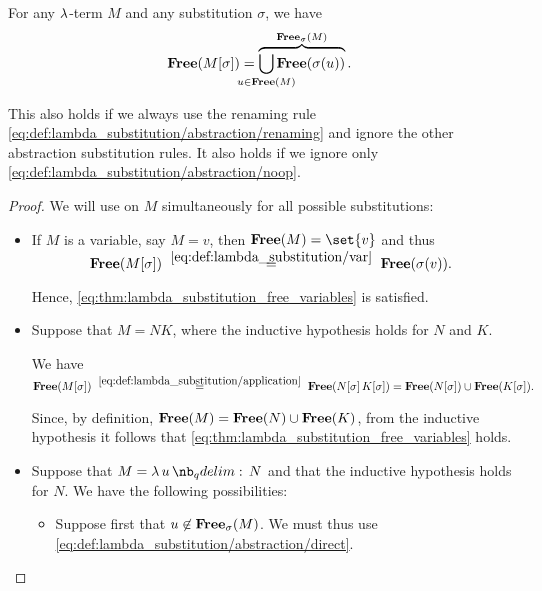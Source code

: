 \begin{proposition}\label{thm:lambda_substitution_free_variables}
  For any \( \mathrm{\lambda} \)-term \( M \) and any substitution \( \sigma \), we have
  \begin{equation}\label{eq:thm:lambda_substitution_free_variables}
    \op*{Free}( M[\sigma] ) = \overbrace{\bigcup_{\mathclap{u \in \op*{Free}(M)}} \op*{Free}(\sigma(u))}^{\op*{Free}_\sigma(M)}.
  \end{equation}

  This also holds if we always use the renaming rule \eqref{eq:def:lambda_substitution/abstraction/renaming} and ignore the other abstraction substitution rules. It also holds if we ignore only \eqref{eq:def:lambda_substitution/abstraction/noop}.
\end{proposition}
\begin{proof}
  We will use  on \( M \) simultaneously for all possible substitutions:
  \begin{itemize}
    \item If \( M \) is a variable, say \( M = v \), then \( \op*{Free}(M) = \set{ v } \) and thus
    \begin{equation*}
      \op*{Free}(M[\sigma])
      \reloset {\eqref{eq:def:lambda_substitution/var}} =
      \op*{Free}(\sigma(v)).
    \end{equation*}

    Hence, \eqref{eq:thm:lambda_substitution_free_variables} is satisfied.

    \item Suppose that \( M = NK \), where the inductive hypothesis holds for \( N \) and \( K \).

    We have
    \begin{equation*}
      \op*{Free}(M[\sigma])
      \reloset {\eqref{eq:def:lambda_substitution/application}} =
      \op*{Free}(N[\sigma] \thinspace K[\sigma])
      =
      \op*{Free}(N[\sigma]) \cup \op*{Free}(K[\sigma]).
    \end{equation*}

    Since, by definition, \( \op*{Free}(M) = \op*{Free}(N) \cup \op*{Free}(K) \), from the inductive hypothesis it follows that \eqref{eq:thm:lambda_substitution_free_variables} holds.

    \item Suppose that \( M = \qabs u N \) and that the inductive hypothesis holds for \( N \). We have the following possibilities:
    \begin{itemize}
      \item Suppose first that \( u \not\in \op*{Free}_\sigma(M) \). We must thus use \eqref{eq:def:lambda_substitution/abstraction/direct}.


\end{itemize}
\end{itemize}
\end{proof}
